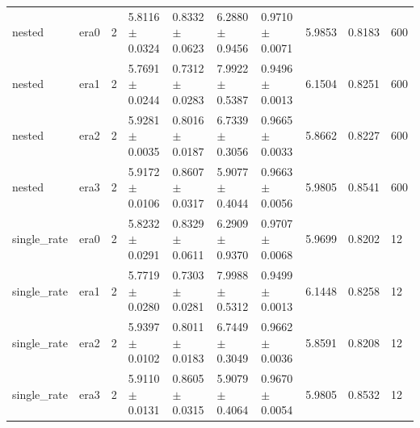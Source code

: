 \begin{tabular}{llllllllll}
nested & era0 & 2 & 5.8116 $\pm$ 0.0324 & 0.8332 $\pm$ 0.0623 & 6.2880 $\pm$ 0.9456 & 0.9710 $\pm$ 0.0071 & 5.9853 & 0.8183 & 600 \\
nested & era1 & 2 & 5.7691 $\pm$ 0.0244 & 0.7312 $\pm$ 0.0283 & 7.9922 $\pm$ 0.5387 & 0.9496 $\pm$ 0.0013 & 6.1504 & 0.8251 & 600 \\
nested & era2 & 2 & 5.9281 $\pm$ 0.0035 & 0.8016 $\pm$ 0.0187 & 6.7339 $\pm$ 0.3056 & 0.9665 $\pm$ 0.0033 & 5.8662 & 0.8227 & 600 \\
nested & era3 & 2 & 5.9172 $\pm$ 0.0106 & 0.8607 $\pm$ 0.0317 & 5.9077 $\pm$ 0.4044 & 0.9663 $\pm$ 0.0056 & 5.9805 & 0.8541 & 600 \\
single\_rate & era0 & 2 & 5.8232 $\pm$ 0.0291 & 0.8329 $\pm$ 0.0611 & 6.2909 $\pm$ 0.9370 & 0.9707 $\pm$ 0.0068 & 5.9699 & 0.8202 & 12 \\
single\_rate & era1 & 2 & 5.7719 $\pm$ 0.0280 & 0.7303 $\pm$ 0.0281 & 7.9988 $\pm$ 0.5312 & 0.9499 $\pm$ 0.0013 & 6.1448 & 0.8258 & 12 \\
single\_rate & era2 & 2 & 5.9397 $\pm$ 0.0102 & 0.8011 $\pm$ 0.0183 & 6.7449 $\pm$ 0.3049 & 0.9662 $\pm$ 0.0036 & 5.8591 & 0.8208 & 12 \\
single\_rate & era3 & 2 & 5.9110 $\pm$ 0.0131 & 0.8605 $\pm$ 0.0315 & 5.9079 $\pm$ 0.4064 & 0.9670 $\pm$ 0.0054 & 5.9805 & 0.8532 & 12 \\
\hline
\end{tabular}
